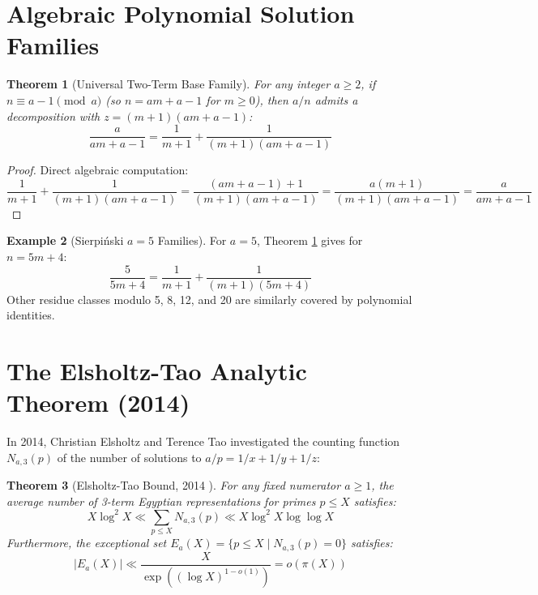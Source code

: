 \documentclass[11pt,a4paper]{article}
\newtheorem{theorem}{Theorem}[section]
\theoremstyle{definition}
\newtheorem{example}[theorem]{Example}
\begin{document}
\section{Algebraic Polynomial Solution Families}

\begin{theorem}[Universal Two-Term Base Family]\label{thm:universal_poly}
For any integer $a \ge 2$, if $n \equiv a - 1 \pmod a$ (so $n = a m + a - 1$ for $m \ge 0$), then $a / n$ admits a decomposition with $z = (m + 1)(a m + a - 1)$:
\begin{equation}\label{eq:universal_poly}
\frac{a}{a m + a - 1} = \frac{1}{m + 1} + \frac{1}{(m + 1)(a m + a - 1)}
\end{equation}
\end{theorem}

\begin{proof}
Direct algebraic computation:
\[ \frac{1}{m + 1} + \frac{1}{(m + 1)(a m + a - 1)} = \frac{(a m + a - 1) + 1}{(m + 1)(a m + a - 1)} = \frac{a(m + 1)}{(m + 1)(a m + a - 1)} = \frac{a}{a m + a - 1} \]
\end{proof}

\begin{example}[Sierpi\'nski $a = 5$ Families]\label{ex:sierpinski_families}
For $a = 5$, Theorem \ref{thm:universal_poly} gives for $n = 5m + 4$:
\[ \frac{5}{5m + 4} = \frac{1}{m + 1} + \frac{1}{(m + 1)(5m + 4)} \]
Other residue classes modulo 5, 8, 12, and 20 are similarly covered by polynomial identities.
\end{example}

\section{The Elsholtz-Tao Analytic Theorem (2014)}

In 2014, Christian Elsholtz and Terence Tao \cite{elsholtz2014} investigated the counting function $N_{a, 3}(p)$ of the number of solutions to $a/p = 1/x + 1/y + 1/z$:

\begin{theorem}[Elsholtz-Tao Bound, 2014 \cite{elsholtz2014}]\label{thm:elsholtz_tao}
For any fixed numerator $a \ge 1$, the average number of 3-term Egyptian representations for primes $p \le X$ satisfies:
\begin{equation}\label{eq:et_bound}
X \log^2 X \ll \sum_{p \le X} N_{a, 3}(p) \ll X \log^2 X \log \log X
\end{equation}
Furthermore, the exceptional set $E_a(X) = \{ p \le X \mid N_{a, 3}(p) = 0 \}$ satisfies:
\begin{equation}\label{eq:exceptional_set}
|E_a(X)| \ll \frac{X}{\exp\left( (\log X)^{1 - o(1)} \right)} = o(\pi(X))
\end{equation}
\end{theorem}
\end{document}
